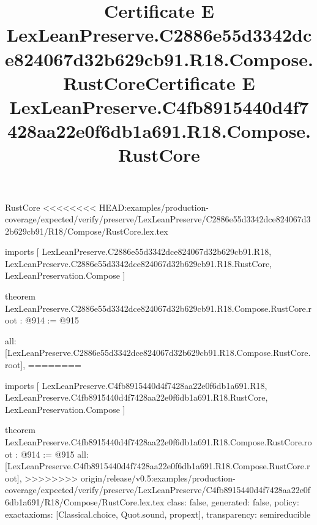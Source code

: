 \begin{lexlean}{RustCore}
<<<<<<<< HEAD:examples/production-coverage/expected/verify/preserve/LexLeanPreserve/C2886e55d3342dce824067d32b629cb91/R18/Compose/RustCore.lex.tex
\title{Certificate E LexLeanPreserve.C2886e55d3342dce824067d32b629cb91.R18.Compose.RustCore}
\begin{coremodule}
imports [
  LexLeanPreserve.C2886e55d3342dce824067d32b629cb91.R18,
  LexLeanPreserve.C2886e55d3342dce824067d32b629cb91.R18.RustCore,
  LexLeanPreservation.Compose
]

theorem LexLeanPreserve.C2886e55d3342dce824067d32b629cb91.R18.Compose.RustCore.root : @914 := @915 {
  all: [LexLeanPreserve.C2886e55d3342dce824067d32b629cb91.R18.Compose.RustCore.root],
========
\title{Certificate E LexLeanPreserve.C4fb8915440d4f7428aa22e0f6db1a691.R18.Compose.RustCore}
\begin{coremodule}
imports [
  LexLeanPreserve.C4fb8915440d4f7428aa22e0f6db1a691.R18,
  LexLeanPreserve.C4fb8915440d4f7428aa22e0f6db1a691.R18.RustCore,
  LexLeanPreservation.Compose
]

theorem LexLeanPreserve.C4fb8915440d4f7428aa22e0f6db1a691.R18.Compose.RustCore.root : @914 := @915 {
  all: [LexLeanPreserve.C4fb8915440d4f7428aa22e0f6db1a691.R18.Compose.RustCore.root],
>>>>>>>> origin/release/v0.5:examples/production-coverage/expected/verify/preserve/LexLeanPreserve/C4fb8915440d4f7428aa22e0f6db1a691/R18/Compose/RustCore.lex.tex
  class: false,
  generated: false,
  policy: exact{axioms: [Classical.choice, Quot.sound, propext]},
  transparency: semireducible
}


\end{coremodule}}
\end{coremodule}
\end{lexlean}
